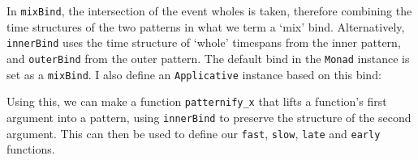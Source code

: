 In \texttt{mixBind}, the intersection of the event wholes is taken,
therefore combining the time structures of the two patterns in what we
term a `mix' bind. Alternatively, \texttt{innerBind} uses the time
structure of `whole' timespans from the inner pattern, and
\texttt{outerBind} from the outer pattern. The default bind in the
\texttt{Monad} instance is set as a \texttt{mixBind}. I also define an
\texttt{Applicative} instance based on this bind:

\begin{Shaded}
\begin{Highlighting}[]
   
\NormalTok{  (}\OperatorTok{\textgreater{}\textgreater{}=}\NormalTok{) }\OtherTok{=}

   
   \OtherTok{=}
\OperatorTok{\textless{}*\textgreater{}}\OtherTok{=}\OperatorTok{\textgreater{}\textgreater{}=}\NormalTok{ (}\OperatorTok{\textless{}$\textgreater{}}
\end{Highlighting}
\end{Shaded}

Using this, we can make a function \texttt{patternify\_x} that lifts a
function's first argument into a pattern, using \texttt{innerBind} to
preserve the structure of the second argument. This can then be used to
define our \texttt{fast}, \texttt{slow}, \texttt{late} and
\texttt{early} functions.

\begin{Shaded}
\begin{Highlighting}[]
\OtherTok{{-}\textgreater{}} \OtherTok{{-}\textgreater{}} \OtherTok{{-}\textgreater{}}
\NormalTok{  (}\OtherTok{{-}\textgreater{}} \OtherTok{{-}\textgreater{}} 
\OtherTok{=}\OtherTok{{-}\textgreater{}}

   \OtherTok{{-}\textgreater{}} \OtherTok{{-}\textgreater{}} 
\OtherTok{=}
\OtherTok{=}
\OtherTok{=}
\OtherTok{=}
\end{Highlighting}
\end{Shaded}

